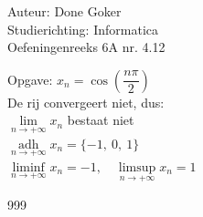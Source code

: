 \documentclass[a4paper]{article}
\begin{document}
  
\noindent \large Auteur: Done Goker \\
\noindent \large Studierichting: Informatica\\
\noindent \large Oefeningenreeks 6A nr. 4.12\\

\medskip

\normalsize

Opgave: $x_n = \cos\left(\dfrac{n\pi}{2}\right)$ \\

De rij convergeert niet, dus: \\

$\lim\limits_{n \rightarrow +\infty} x_n$ bestaat niet \\

$\operatorname*{adh}\limits_{n \rightarrow +\infty} x_n = \{ -1,\ 0,\ 1 \}$ \\

$\liminf\limits_{n \rightarrow +\infty} x_n = -1,\quad \limsup\limits_{n \rightarrow +\infty} x_n = 1$ \\



\begin{thebibliography}{999}
\end{thebibliography}
\end{document}
